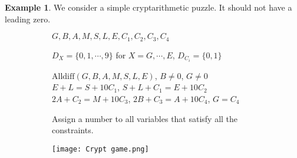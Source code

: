 \documentclass{article}
\theoremstyle{definition}
\newtheorem{example}{Example}[definition]
\begin{document}
\begin{example}
	\label{Cryptarithmetic puzzle}
	We consider a simple cryptarithmetic puzzle. It should not have a leading zero.
	\begin{figure}[h]
		\begin{subfigure}[h]{0.69\textwidth}
			\begin{description}[style=nextline]
				\item[Variables:] $G,B,A,M,S,L,E,C_{1},C_{2},C_{3},C_{4}$
				\item[Domain:] $D_{X}=\{0,1,\cdots,9\}$ for $X=G,\cdots,E$, $D_{C_{i}}=\{0,1\}$
				\item[Constraint:] $\text{Alldiff}(G,B,A,M,S,L,E)$, $B\neq 0$, $G\neq 0$\\
				$E+L=S+10C_{1}$, $S+L+C_{1}=E+10C_{2}$\\
				$2A+C_{2}=M+10C_{3}$, $2B+C_{3}=A+10C_{4}$, $G=C_{4}$
				\item[Goal:] Assign a number to all variables that satisfy all the constraints.
			\end{description}
		\end{subfigure}
		\begin{subfigure}[h]{0.3\textwidth}
			\texttt{[image: Crypt game.png]}
		\end{subfigure}
	\end{figure}
\end{example}
\end{document}
